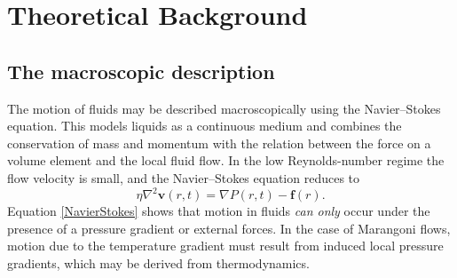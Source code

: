 \section{Theoretical Background}
\subsection{The macroscopic description}\label{Macroscopic}
The motion of fluids may be described macroscopically using the Navier--Stokes equation.\cite{simpleLiquids} 
This models liquids as a continuous medium and combines the conservation of mass and momentum with the relation between the force on a volume element and the local fluid flow.
In the low Reynolds-number regime the flow velocity is small, and the Navier--Stokes equation reduces to
\begin{equation}
\label{NavierStokes}
\eta \nabla^{2}\mathbf{v}(r,t) = \nabla P(r,t) - \mathbf{f}(r).
\end{equation}
Equation \ref{NavierStokes} shows that motion in fluids \textit{can only} occur under the presence of a pressure gradient or external forces.
In the case of Marangoni flows, motion due to the temperature gradient must result from induced local pressure gradients, which may be derived from thermodynamics.

